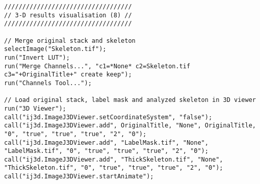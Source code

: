 \begin{lstlisting}
///////////////////////////////////
// 3-D results visualisation (8) //
///////////////////////////////////

// Merge original stack and skeleton 
selectImage("Skeleton.tif");
run("Invert LUT");
run("Merge Channels...", "c1=*None* c2=Skeleton.tif c3="+OriginalTitle+" create keep");
run("Channels Tool...");

// Load original stack, label mask and analyzed skeleton in 3D viewer
run("3D Viewer");
call("ij3d.ImageJ3DViewer.setCoordinateSystem", "false");
call("ij3d.ImageJ3DViewer.add", OriginalTitle, "None", OriginalTitle, "0", "true", "true", "true", "2", "0");
call("ij3d.ImageJ3DViewer.add", "LabelMask.tif", "None", "LabelMask.tif", "0", "true", "true", "true", "2", "0");
call("ij3d.ImageJ3DViewer.add", "ThickSkeleton.tif", "None", "ThickSkeleton.tif", "0", "true", "true", "true", "2", "0");
call("ij3d.ImageJ3DViewer.startAnimate");

\end{lstlisting}
